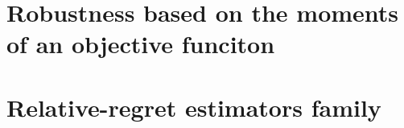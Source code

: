 \documentclass[../../Main_ManuscritThese.tex]{subfiles}
\begin{document}
\label{sec:def_robustness}


\section{Robustness based on the moments of an objective funciton}
\label{sec:rob_moments}

\section{Relative-regret estimators family}
\label{sec:rr_family}



\subfileLocal{
	\pagestyle{empty}
	
	
      }
\end{document}
